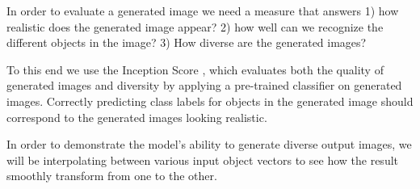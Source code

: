 \documentclass{article}
\begin{document}
In order to evaluate a generated image we need a measure that answers 1) how realistic does the generated image appear? 2) how well can we recognize the different objects in the image? 3) How diverse are the generated images?

To this end we use the Inception Score \cite{inception}, which evaluates both the quality of generated images and diversity by applying a pre-trained classifier on generated images. Correctly predicting class labels for objects in the generated image should correspond to the generated images looking realistic.

In order to demonstrate the model's ability to generate diverse output images, we will be interpolating between various input object vectors to see how the result smoothly transform from one to the other.
\end{document}
